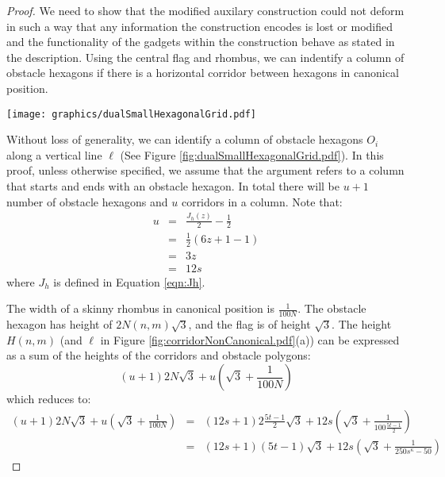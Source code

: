 \documentclass[10pt]{CSUNthesis}
\theoremstyle{plain}%
\theoremstyle{definition}
\theoremstyle{remark}
\newcommand{\lr}[1]{\left( #1 \right)}
\begin{document}
\begin{proof}
We need to show that the modified auxilary construction could not deform in such a way that any information the construction encodes is lost or modified and the functionality of the gadgets within the construction behave as stated in the description.  
Using the central flag and rhombus, we can indentify a column of obstacle hexagons if there is a horizontal corridor between hexagons in canonical position.

\begin{minipage}{\linewidth}
\begin{center}
\texttt{[image: graphics/dualSmallHexagonalGrid.pdf]}
\label{fig:dualSmallHexagonalGrid.pdf}
\end{center}
\end{minipage}

Without loss of generality, we can identify a column of obstacle hexagons $O_i$ along a vertical line $\ell$ (See Figure \ref{fig:dualSmallHexagonalGrid.pdf}).
In this proof, unless otherwise specified, we assume that the argument refers to a column that starts and ends with an obstacle hexagon.  
In total there will be $u+1$ number of obstacle hexagons and $u$ corridors in a column.
Note that:
$$\begin{array}{rcl}
u&=& \frac{J_h (z)}{2} - \frac{1}{2}\\
&=& \frac{1}{2}\lr{6z + 1 - 1}\\
&=& 3z\\
&=& 12s
\end{array}$$
where $J_h$ is defined in Equation \ref{eqn:Jh}.

The width of a skinny rhombus in canonical position is $\frac{1}{100N}$.
The obstacle hexagon has height of $ 2 N(n,m) \sqrt{3}$, and the flag is of height $\sqrt{3}$. 
The height $H(n,m)$ (and $\ell$ in Figure \ref{fig:corridorNonCanonical.pdf}(a)) can be expressed as a sum of the heights of the corridors and obstacle polygons:
$$(u+1) 2 N \sqrt{3} + u \lr{\sqrt{3}+ \frac{1}{100N}}$$
which reduces to:
\begin{eqnarray*}
(u+1) 2 N  \sqrt{3} + u \lr{\sqrt{3}+ \frac{1}{100N}}&=&(12s+1) 2 \frac{5t-1}{2}  \sqrt{3} + 12s \lr{\sqrt{3}+ \frac{1}{100\frac{5t-1}{2}}}\\
&=&(12s+1)  (5t-1)  \sqrt{3} + 12s \lr{\sqrt{3}+ \frac{1}{250s^\kappa-50}}
\end{eqnarray*}


\end{proof}
\end{document}
